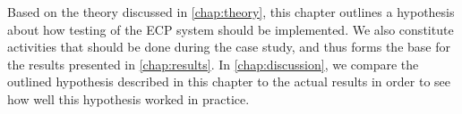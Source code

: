 Based on the theory discussed in \ref{chap:theory}, this chapter
outlines a hypothesis about how testing of the ECP system should be
implemented. We also constitute activities that should be done during
the case study, and thus forms the base for the results presented in
\ref{chap:results}. In \ref{chap:discussion}, we compare the outlined
hypothesis described in this chapter to the actual results in order to
see how well this hypothesis worked in practice.
